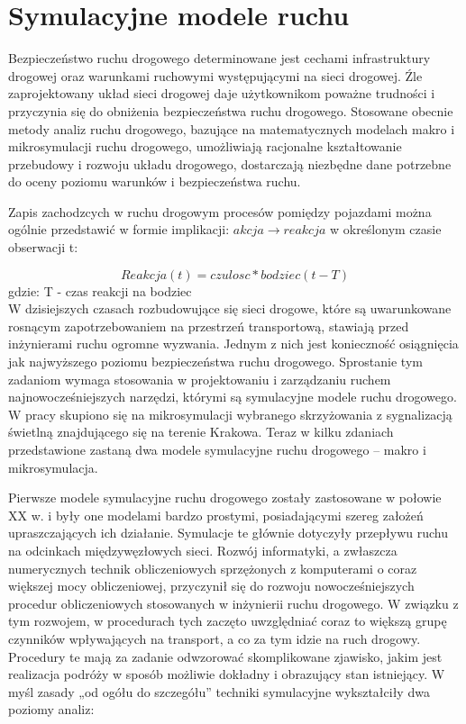 \documentclass{sprawozdanie-agh}
\begin{document}
		\section{Symulacyjne modele ruchu}

		Bezpieczeństwo ruchu drogowego determinowane jest cechami infrastruktury drogowej oraz warunkami ruchowymi występującymi na sieci drogowej. Źle zaprojektowany układ sieci drogowej daje użytkownikom poważne trudności i przyczynia się do obniżenia bezpieczeństwa ruchu drogowego. Stosowane obecnie metody analiz ruchu drogowego, bazujące na matematycznych modelach makro i mikrosymulacji ruchu drogowego, umożliwiają racjonalne kształtowanie przebudowy i rozwoju układu drogowego, dostarczają niezbędne dane potrzebne do oceny poziomu warunków i bezpieczeństwa ruchu.

		Zapis zachodzcych w ruchu drogowym procesów pomiędzy pojazdami można ogólnie przedstawić w formie implikacji: $ akcja \rightarrow reakcja $ w określonym czasie obserwacji t:

		\begin{equation}
			Reakcja(t)=czulosc*bodziec(t-T)
		\end{equation}
		gdzie: T - czas reakcji na bodziec \\

		W dzisiejszych czasach rozbudowujące się sieci drogowe, które są uwarunkowane rosnącym zapotrzebowaniem na przestrzeń transportową, stawiają przed inżynierami ruchu ogromne wyzwania. Jednym z nich jest konieczność osiągnięcia jak najwyższego poziomu bezpieczeństwa ruchu drogowego. Sprostanie tym zadaniom wymaga stosowania w projektowaniu i zarządzaniu ruchem najnowocześniejszych narzędzi, którymi są symulacyjne modele ruchu drogowego.
		W pracy skupiono się na mikrosymulacji wybranego skrzyżowania z sygnalizacją świetlną znajdującego się na terenie Krakowa. Teraz w kilku zdaniach przedstawione zastaną dwa modele symulacyjne ruchu drogowego -- makro i mikrosymulacja.

		Pierwsze modele symulacyjne ruchu drogowego zostały zastosowane w połowie XX w. i były one modelami bardzo prostymi, posiadającymi szereg założeń upraszczających ich działanie. Symulacje te głównie dotyczyły przepływu ruchu na odcinkach międzywęzłowych sieci. Rozwój informatyki, a zwłaszcza numerycznych technik obliczeniowych sprzężonych z komputerami o coraz większej mocy obliczeniowej, przyczynił się do rozwoju nowocześniejszych procedur obliczeniowych stosowanych w inżynierii ruchu drogowego. W związku z tym rozwojem, w procedurach tych zaczęto uwzględniać coraz to większą grupę czynników wpływających na transport, a co za tym idzie na ruch drogowy. Procedury te mają za zadanie odwzorować skomplikowane zjawisko, jakim jest realizacja podróży w sposób możliwie dokładny i obrazujący stan istniejący. W myśl zasady „od ogółu do szczegółu” techniki symulacyjne wykształciły dwa poziomy analiz:
\end{document}
